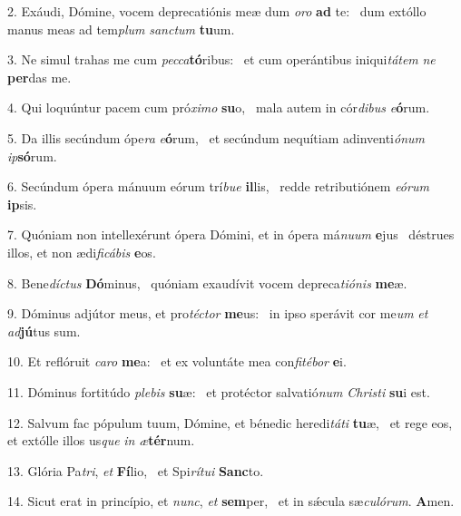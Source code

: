 2. Exáudi, Dómine, vocem deprecatiónis meæ dum \textit{o}\textit{ro} \textbf{ad} te: \ast\  dum extóllo manus meas ad tem\textit{plum} \textit{sanc}\textit{tum} \textbf{tu}um.\

3. Ne simul trahas me cum \textit{pec}\textit{ca}\textbf{tó}ribus: \ast\  et cum operántibus iniqui\textit{tá}\textit{tem} \textit{ne} \textbf{per}das me.\

4. Qui loquúntur pacem cum pró\textit{xi}\textit{mo} \textbf{su}o, \ast\  mala autem in cór\textit{di}\textit{bus} \textit{e}\textbf{ó}rum.\

5. Da illis secúndum ópe\textit{ra} \textit{e}\textbf{ó}rum, \ast\  et secúndum nequítiam adinventi\textit{ó}\textit{num} \textit{ip}\textbf{só}rum.\

6. Secúndum ópera mánuum eórum trí\textit{bu}\textit{e} \textbf{il}lis, \ast\  redde retributiónem \textit{e}\textit{ó}\textit{rum} \textbf{ip}sis.\

7. Quóniam non intellexérunt ópera Dómini, et in ópera má\textit{nu}\textit{um} \textbf{e}jus \ast\  déstrues illos, et non ædi\textit{fi}\textit{cá}\textit{bis} \textbf{e}os.\

8. Bene\textit{díc}\textit{tus} \textbf{Dó}minus, \ast\  quóniam exaudívit vocem depreca\textit{ti}\textit{ó}\textit{nis} \textbf{me}æ.\

9. Dóminus adjútor meus, et pro\textit{téc}\textit{tor} \textbf{me}us: \ast\  in ipso sperávit cor me\textit{um} \textit{et} \textit{ad}\textbf{jú}tus sum.\

10. Et reflóruit \textit{ca}\textit{ro} \textbf{me}a: \ast\  et ex voluntáte mea con\textit{fi}\textit{té}\textit{bor} \textbf{e}i.\

11. Dóminus fortitúdo \textit{ple}\textit{bis} \textbf{su}æ: \ast\  et protéctor salvatió\textit{num} \textit{Chris}\textit{ti} \textbf{su}i est.\

12. Salvum fac pópulum tuum, Dómine, et bénedic heredi\textit{tá}\textit{ti} \textbf{tu}æ, \ast\  et rege eos, et extólle illos us\textit{que} \textit{in} \textit{æ}\textbf{tér}num.\

13. Glória Pa\textit{tri}, \textit{et} \textbf{Fí}lio, \ast\  et Spi\textit{rí}\textit{tu}\textit{i} \textbf{Sanc}to.\

14. Sicut erat in princípio, et \textit{nunc}, \textit{et} \textbf{sem}per, \ast\  et in sǽcula sæ\textit{cu}\textit{ló}\textit{rum}. \textbf{A}men.\

